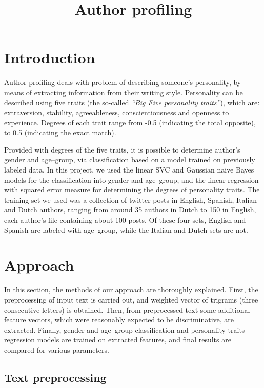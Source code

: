 \documentclass[10pt, a4paper]{article}
\title{Author profiling}
\begin{document}
\maketitleabstract

\section{Introduction}

Author profiling deals with problem of describing someone's personality, by means of extracting information from their writing style.
Personality can be described using five traits (the so-called \textit{``Big Five personality traits''}), which are: extraversion, stability, agreeableness, conscientiousness and openness to experience.
Degrees of each trait range from -0.5 (indicating the total opposite), to 0.5 (indicating the exact match).

Provided with degrees of the five traits, it is possible to determine author's gender and age--group, via classification based on a model trained on previously labeled data.
In this project, we used the linear SVC and Gaussian naive Bayes models for the classification into gender and age--group, and the linear regression with squared error measure for determining the degrees of personality traits.
The training set we used was a collection of twitter posts in English, Spanish, Italian and Dutch authors, ranging from around 35 authors in Dutch to 150 in English, each author's file containing about 100 posts.
Of these four sets, English and Spanish are labeled with age--group, while the Italian and Dutch sets are not.

\section{Approach}

In this section, the methods of our approach are thoroughly explained.
First, the preprocessing of input text is carried out, and weighted vector of trigrams (three consecutive letters) is obtained.
Then, from preprocessed text some additional feature vectors, which were reasonably expected to be discriminative, are extracted.
Finally, gender and age--group classification and personality traits regression models are trained on extracted features, and final results are compared for various parameters.

\subsection{Text preprocessing}
\end{document}

